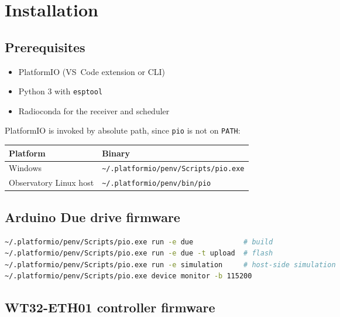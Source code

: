 \documentclass[11pt,a4paper]{article}
\begin{document}
\section{Installation}
\label{sec:installation}

\subsection{Prerequisites}

\begin{itemize}
    \item PlatformIO (VS~Code extension or CLI)
    \item Python 3 with \texttt{esptool}
    \item Radioconda for the receiver and scheduler
\end{itemize}

PlatformIO is invoked by absolute path, since \texttt{pio} is not on \texttt{PATH}:

\begin{center}
\begin{tabular}{ll}
\toprule
\textbf{Platform} & \textbf{Binary} \\
\midrule
Windows & \texttt{\textasciitilde/.platformio/penv/Scripts/pio.exe} \\
Observatory Linux host & \texttt{\textasciitilde/.platformio/penv/bin/pio} \\
\bottomrule
\end{tabular}
\end{center}

\subsection{Arduino Due drive firmware}

\begin{lstlisting}[language=bash]
~/.platformio/penv/Scripts/pio.exe run -e due            # build
~/.platformio/penv/Scripts/pio.exe run -e due -t upload  # flash
~/.platformio/penv/Scripts/pio.exe run -e simulation     # host-side simulation
~/.platformio/penv/Scripts/pio.exe device monitor -b 115200
\end{lstlisting}

\subsection{WT32-ETH01 controller firmware}
\end{document}
